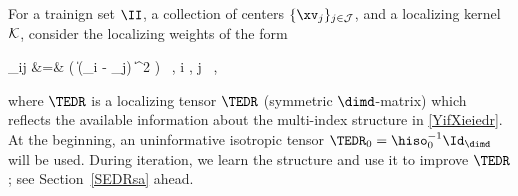 For a trainign set \( \II \), a collection of centers \( \{ \xv_{j} \}_{j \in \JJJ} \),
and a localizing kernel \( \mathcal{K} \), consider the localizing weights of the form
\begin{EQA}
	\weight_{ij}
	&=&
	\Kern\bigl( \| \TEDR(\Xv_{i} - \xv_{j}) \|^{2} \bigr) 
	\, ,
	\qquad
	i \in \II,
	\;
	j \in \JJJ
	\, ,
\label{s7cuqkdwywdhbjwbfjwbdjm}
\end{EQA}
where \( \TEDR \) is a localizing tensor \( \TEDR \) (symmetric \( \dimd \)-matrix)
which reflects the available information about the multi-index structure in \eqref{YifXieiedr}.
At the beginning, an uninformative isotropic tensor \( \TEDR_{0} = \hiso_{0}^{-1} \Id_{\dimd} \) will be used.
During iteration, we learn the structure and use it to improve \( \TEDR \); see Section~\ref{SEDRsa} ahead.

